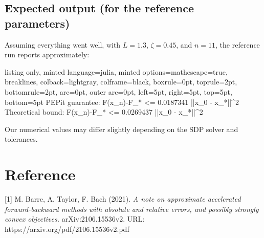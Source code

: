 \documentclass{article}
\begin{document}
\subsection{Expected output (for the reference parameters)}

Assuming everything went well, with $L=1.3$, $\zeta=0.45$, and $n=11$, the reference run reports approximately:

\begin{tcblisting}{listing only, minted language=julia, minted options={mathescape=true, breaklines}, colback=lightgray, colframe=black, boxrule=0pt, toprule=2pt, bottomrule=2pt, arc=0pt, outer arc=0pt, left=5pt, right=5pt, top=5pt, bottom=5pt}
PEPit guarantee:      F(x_n)-F_* <= 0.0187341 ||x_0 - x_*||^2
Theoretical bound:    F(x_n)-F_* <= 0.0269437 ||x_0 - x_*||^2
\end{tcblisting}


Our numerical values may differ slightly depending on the SDP solver and tolerances. 
\section{Reference}

[1] M. Barre, A. Taylor, F. Bach (2021).
\emph{A note on approximate accelerated forward-backward methods with absolute and relative errors, and possibly strongly convex objectives.}
arXiv:2106.15536v2.
URL: https://arxiv.org/pdf/2106.15536v2.pdf
\end{document}
